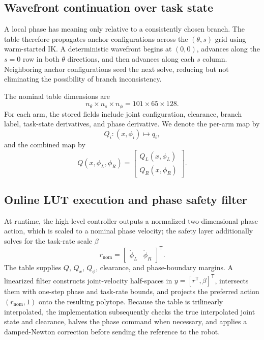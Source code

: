 \documentclass[preprint,12pt]{elsarticle}
\newcommand{\T}{^{\mathsf T}}
\begin{document}
\subsection{Wavefront continuation over task state}

A local phase has meaning only relative to a consistently chosen branch. The table therefore propagates anchor configurations across the $(\theta,s)$ grid using warm-started IK. A deterministic wavefront begins at $(0,0)$, advances along the $s=0$ row in both $\theta$ directions, and then advances along each $s$ column. Neighboring anchor configurations seed the next solve, reducing but not eliminating the possibility of branch inconsistency.

The nominal table dimensions are
\begin{equation}
 n_\theta\times n_s\times n_\phi = 101\times65\times128.
\end{equation}
For each arm, the stored fields include joint configuration, clearance, branch label, task-state derivatives, and phase derivative. We denote the per-arm map by
\begin{equation}
Q_i:(x,\phi_i)\mapsto q_i,
\end{equation}
and the combined map by
\begin{equation}
Q(x,\phi_L,\phi_R)
=
\begin{bmatrix}Q_L(x,\phi_L)\\Q_R(x,\phi_R)\end{bmatrix}.
\label{eq:combined_lut}
\end{equation}

\subsection{Online LUT execution and phase safety filter}

At runtime, the high-level controller outputs a normalized two-dimensional phase action, which is scaled to a nominal phase velocity; the safety layer additionally solves for the task-rate scale $\beta$
\begin{equation}
r_{\mathrm{nom}}
=
\begin{bmatrix}\dot\phi_L&\dot\phi_R\end{bmatrix}\T.
\end{equation}
The table supplies $Q$, $Q_x$, $Q_\phi$, clearance, and phase-boundary margins. A linearized filter constructs joint-velocity half-spaces in $y=[r\T,\beta]\T$, intersects them with one-step phase and task-rate bounds, and projects the preferred action $(r_{\mathrm{nom}},1)$ onto the resulting polytope. Because the table is trilinearly interpolated, the implementation subsequently checks the true interpolated joint state and clearance, halves the phase command when necessary, and applies a damped-Newton correction before sending the reference to the robot.
\end{document}
